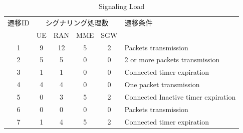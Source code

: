 \documentclass[a4j]{ujarticle}
\begin{document}
    \begin{table}[htbp]
      \centering
      \caption{Signaling Load}
      \label{table:signalings_all}
      \begin{tabular}{c|cccc|l}
        \hline
        遷移ID  & \multicolumn{4}{|c|}{シグナリング処理数} & 遷移条件                          \\
                & UE      & RAN     & MME     & SGW      &                                   \\ \hline \hline
        1       & 9       & 12      & 5       & 2        & Packets transmission              \\
        2       & 5       & 5       & 0       & 0        & 2 or more packets transmission    \\
        3       & 1       & 1       & 0       & 0        & Connected timer expiration        \\
        4       & 4       & 4       & 0       & 0        & One packet transmission           \\
        5       & 0       & 3       & 5       & 2        & Connected Inactive timer expiration             \\
        6       & 0       & 0       & 0       & 0        & Packets transmission              \\
        7       & 1       & 4       & 5       & 2        & Connected timer expiration            \\ \hline
      \end{tabular}
    \end{table}
\end{document}
